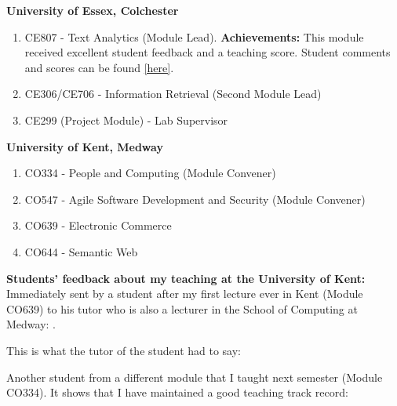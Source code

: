 \documentclass[margin]{res}
\begin{document}
\begin{resume}
\textbf{University of Essex, Colchester}\\
\begin{enumerate}
    \item CE807 - Text Analytics (Module Lead). \textbf{Achievements:} This module received excellent student feedback and a teaching score. Student comments and scores can be found \href{https://drive.google.com/file/d/1S5xoQOVRjkppus1jlcfoXiVYurx1Uhpj/view?usp=sharing}{[here]}.
    \item CE306/CE706 - Information Retrieval (Second Module Lead)
    \item CE299 (Project Module) - Lab Supervisor
\end{enumerate}
\textbf{University of Kent, Medway}\\
\begin{enumerate}
    \item CO334 - People and Computing (Module Convener)
    \item CO547 - Agile Software Development and Security (Module Convener)
    \item CO639 - Electronic Commerce
    \item CO644 - Semantic Web
\end{enumerate}
\textbf{Students' feedback about my teaching at the University of Kent:} \newline
Immediately sent by a student after my first lecture ever in Kent (Module CO639) to his tutor who is also a lecturer in the School of Computing at Medway: .

This is what the tutor of the student had to say: 

Another student from a different module that I taught next semester (Module CO334). It shows that I have maintained a good teaching track record:


\end{resume}
\end{document}
